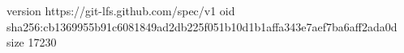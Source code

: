 version https://git-lfs.github.com/spec/v1
oid sha256:cb1369955b91c6081849ad2db225f051b10d1b1affa343e7aef7ba6aff2ada0d
size 17230
